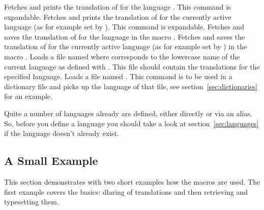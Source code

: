 \documentclass[DIV9,toc=index,toc=bib,numbers=noendperiod]{cnpkgdoc}
\newcommand*\unexpsign{$\RHD$}
\newcommand*\expsign{\textcolor{red}{$\rhd$}}
\renewcommand*\cnpkgdoctriangle{\unexpsign}
\newcommand*\expandable{%
  \def\cnpkgdoctriangle{%
    \expsign
    \gdef\cnpkgdoctriangle{\unexpsign}}}
\begin{document}
\begin{beschreibung}
 \expandable{}\newline
   Fetches and prints the translation of  for the language .
   This command is expandable.
 \expandable{}\newline
   Fetches and prints the translation of  for the currently active
   language (as for example set by ). This command is expandable.
 \newline
   Fetches and saves the translation of  for the language 
   in the macro .
 \newline
   Fetches and saves the translation of  for the currently active
   language (as for example set by ) in the macro .
 \newline
   Loads a file named  where  corresponds
   to the lowercase name of the current language as defined with
   . This file should contain the translations for the
   specified language.
 \newline
   Loads a file named .
 \newline
   This command is to be used in a dictionary file and picks up the language
   of that file, see section~\ref{sec:dictionaries} for an example.
\end{beschreibung}
Quite a number of languages already are defined, either directly or via an alias.
So, before you define a language you should take a look at
section~\ref{sec:languages} if the language doesn't already exist.

\subsection{A Small Example}
This section demonstrates with two short examples how the macros are used.
The first example covers the basics: dlaring of translations and then
retrieving and typesetting them.

\begin{beispiel}
 
 \SaveTranslation{}
 \SaveTranslationFor{}

  \kitchen\ 
 \cuisine
\end{beispiel}
\end{document}
